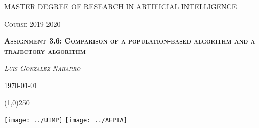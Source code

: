\documentclass{article}[12pt]
\begin{document}
	\begin{titlepage}
		\centering
		{\scshape\huge MASTER DEGREE OF RESEARCH IN ARTIFICIAL INTELLIGENCE \par}
		\vspace{1cm}
		{\scshape\large Course 2019-2020 \par}
		\vspace{1cm}
		{\scshape\huge \bf{Assignment 3.6: Comparison of a population-based algorithm and a trajectory algorithm} \par}
		\vspace{1cm}
		{\scshape\LARGE \it{Luis Gonzalez Naharro} \par}
		\vspace{1cm}
		{\scshape\large \today \par}
		\vspace{1cm}
		{\scshape\large \line(1,0){250} \par}
		\vspace{.2cm}
		\texttt{[image: ../UIMP]}
		\texttt{[image: ../AEPIA]}
	\end{titlepage}
	
	\tableofcontents
	
	\newpage
	
	\listoffigures
	
	\newpage
	
	\listofalgorithms
	
	\newpage
	
	\listoftables
	
	\newpage
	
\end{document}
